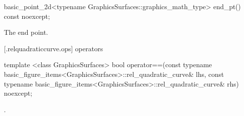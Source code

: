 %
\begin{itemdecl}
basic_point_2d<typename GraphicsSurfaces::graphics_math_type> end_pt() const noexcept;
\end{itemdecl}
\begin{itemdescr}
\pnum
\returns
The end point.
\end{itemdescr}

 [\iotwod.relquadraticcurve.ops]{ operators}

%
\begin{itemdecl}
template <class GraphicsSurfaces>
bool operator==(const typename basic_figure_items<GraphicsSurfaces>::rel_quadratic_curve& lhs,
  const typename basic_figure_items<GraphicsSurfaces>::rel_quadratic_curve& rhs) noexcept;
\end{itemdecl}
\begin{itemdescr}
\pnum
\returns
{}.
\end{itemdescr}
